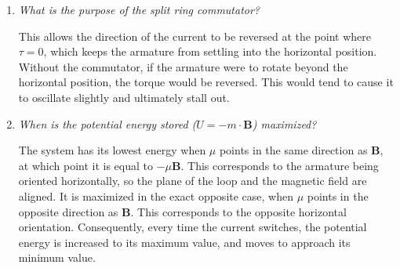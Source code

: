 \documentclass[a4paper,10pt]{report}
\newcommand{\vb}[1]{\mathbf{#1}}		%
\begin{document}
\begin{enumerate}
	\item
		\textit{What is the purpose of the split ring commutator?}

		This allows the direction of the current to be reversed at the point where $\tau = 0$, which keeps the armature from settling into the horizontal position. Without the commutator, if the armature were to rotate beyond the horizontal position, the torque would be reversed. This would tend to cause it to oscillate slightly and ultimately stall out.

	\item
		\textit{When is the potential energy stored ($U=-m\cdot\vb{B}$) maximized?}

		The system has its lowest energy when $\mu$ points in the same direction as $\vb{B}$, at which point it is equal to $-\mu\vb{B}$. This corresponds to the armature being oriented horizontally, so the plane of the loop and the magnetic field are aligned. It is maximized in the exact opposite case, when $\mu$ points in the opposite direction as $\vb{B}$. This corresponds to the opposite horizontal orientation. Consequently, every time the current switches, the potential energy is increased to its maximum value, and moves to approach its minimum value.
\end{enumerate}
\end{document}
